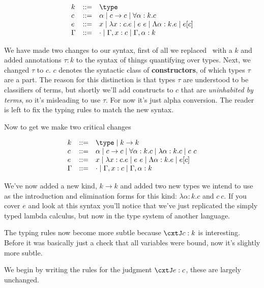 \documentclass{amsart}
\begin{document}
\[
\begin{array}{lcl}
  k & ::= & \type\\
  c & ::= & \alpha \mid c \to c \mid \forall \alpha : k. c\\
  e & ::= & x \mid \lambda x : c. e \mid e\ e \mid
            \Lambda \alpha : k. e \mid e[c]\\
  \Gamma & ::= & \cdot \mid \Gamma, x : c \mid \Gamma, \alpha : k
\end{array}
\]

We have made two changes to our syntax, first of all we replaced \type
\, with a $k$ and added annotations $\tau : k$ to the syntax of things
quantifying over types. Next, we changed $\tau$ to $c$. $c$ denotes the syntactic class of {\bf constructors}, of which types $\tau$ are a part. The reason for this distinction is that types $\tau$ are understood to be classifiers of terms, but shortly we'll add constructs to $c$ that are \emph{uninhabited by terms}, so it's misleading to use $\tau$. For now it's just alpha
conversion. The reader is left to fix the typing rules to match the
new syntax.

Now to get \Fomega we make two critical changes

\[
\begin{array}{lcl}
  k & ::= & \type \mid k \to k\\
  c & ::= & \alpha \mid c \to c \mid \forall \alpha : k. c
            \mid \lambda \alpha : k. c \mid c\ c\\
  e & ::= & x \mid \lambda x : c. e \mid e\ e \mid
            \Lambda \alpha : k. e \mid e[c]\\
  \Gamma & ::= & \cdot \mid \Gamma, x : c \mid \Gamma, \alpha : k
\end{array}
\]

We've now added a new kind, $k \to k$ and added two new types we
intend to use as the introduction and elimination forms for this
kind: $\lambda \alpha : k. c$ and $c\ c$. If you cover $e$ and look at
this syntax you'll notice that we've just replicated the simply typed
lambda calculus, but now in the type system of another language.

The typing rules now become more subtle because $\cxtJ c : k$
is interesting. Before it was basically just a check that all
variables were bound, now it's slightly more subtle.

We begin by writing the rules for the judgment $\cxtJ e : c$,
these are largely unchanged.
\end{document}
